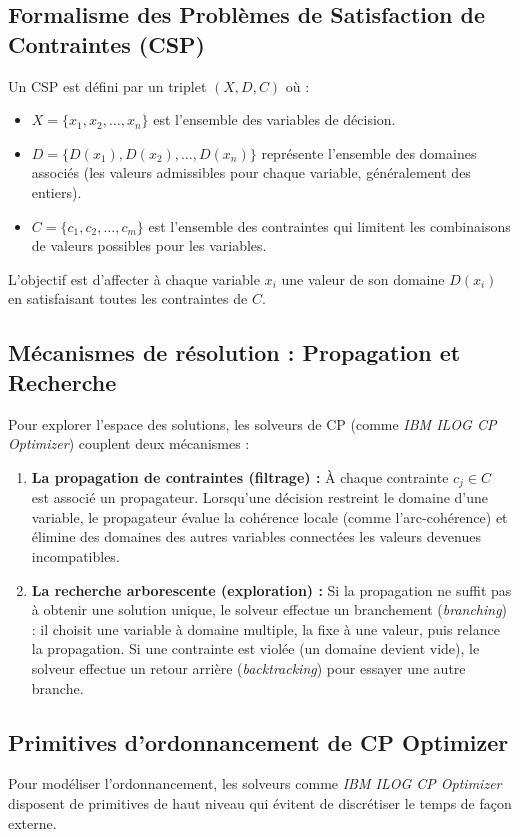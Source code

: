 \subsection{Formalisme des Problèmes de Satisfaction de Contraintes (CSP)}
Un CSP est défini par un triplet $(X, D, C)$ où :
\begin{itemize}
    \item $X = \{x_1, x_2, \dots, x_n\}$ est l'ensemble des variables de décision.
    \item $D = \{D(x_1), D(x_2), \dots, D(x_n)\}$ représente l'ensemble des domaines associés (les valeurs admissibles pour chaque variable, généralement des entiers).
    \item $C = \{c_1, c_2, \dots, c_m\}$ est l'ensemble des contraintes qui limitent les combinaisons de valeurs possibles pour les variables.
\end{itemize}

L'objectif est d'affecter à chaque variable $x_i$ une valeur de son domaine $D(x_i)$ en satisfaisant toutes les contraintes de $C$.

\subsection{Mécanismes de résolution : Propagation et Recherche}
Pour explorer l'espace des solutions, les solveurs de CP (comme \textit{IBM ILOG CP Optimizer}) couplent deux mécanismes :
\begin{enumerate}
    \item \textbf{La propagation de contraintes (filtrage) :} À chaque contrainte $c_j \in C$ est associé un propagateur. Lorsqu'une décision restreint le domaine d'une variable, le propagateur évalue la cohérence locale (comme l'arc-cohérence) et élimine des domaines des autres variables connectées les valeurs devenues incompatibles.
    \item \textbf{La recherche arborescente (exploration) :} Si la propagation ne suffit pas à obtenir une solution unique, le solveur effectue un branchement (\textit{branching}) : il choisit une variable à domaine multiple, la fixe à une valeur, puis relance la propagation. Si une contrainte est violée (un domaine devient vide), le solveur effectue un retour arrière (\textit{backtracking}) pour essayer une autre branche.
\end{enumerate}

\subsection{Primitives d'ordonnancement de CP Optimizer}
Pour modéliser l'ordonnancement, les solveurs comme \textit{IBM ILOG CP Optimizer} disposent de primitives de haut niveau qui évitent de discrétiser le temps de façon externe.

